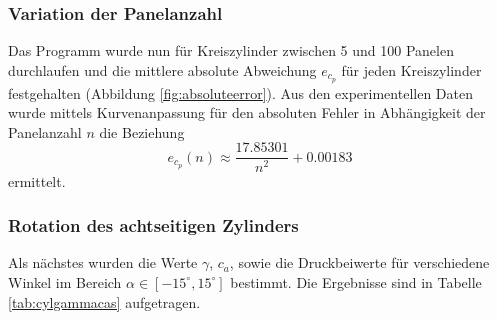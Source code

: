 \subsubsection{Variation der Panelanzahl}
Das Programm wurde nun für Kreiszylinder zwischen 5 und 100 Panelen durchlaufen und die mittlere absolute Abweichung $e_{c_p}$ für jeden Kreiszylinder festgehalten (Abbildung \ref{fig:absoluteerror}). Aus den experimentellen Daten wurde mittels Kurvenanpassung für den absoluten Fehler in Abhängigkeit der Panelanzahl $n$ die Beziehung 
\begin{equation}
e_{c_{p}}(n) \approx \frac{17.85301}{n^2} + 0.00183
\end{equation}
ermittelt.

\subsubsection{Rotation des achtseitigen Zylinders}
Als nächstes wurden die Werte $\gamma$, $c_a$, sowie die Druckbeiwerte für verschiedene Winkel im Bereich $\alpha \in [-15^{\circ}, 15^{\circ}]$ bestimmt. Die Ergebnisse sind in Tabelle \ref{tab:cylgammacas} aufgetragen. 


